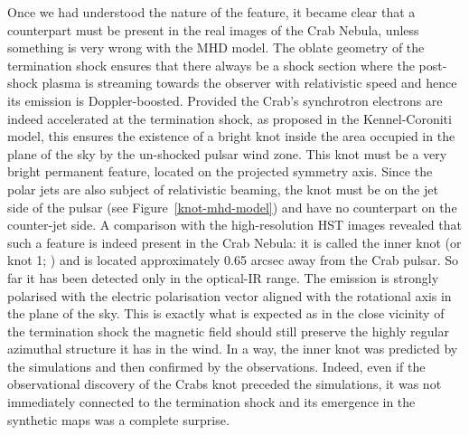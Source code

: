 Once we had understood the nature of the feature, it became clear that a counterpart must be present in the real images of the Crab Nebula, unless something is very wrong with the MHD model. The oblate geometry of the termination shock ensures that there always be a shock section where the post-shock plasma is streaming towards the observer with relativistic speed and hence its emission is Doppler-boosted.   Provided the Crab’s synchrotron electrons are indeed accelerated at the termination shock, as proposed in the Kennel-Coroniti model, this ensures the existence of a bright knot inside the area occupied in the plane of the sky by the un-shocked pulsar wind zone.  This knot must be a very bright permanent feature, located on the projected symmetry axis. Since the polar jets are also subject of relativistic beaming, the knot must be on the jet side of the pulsar (see Figure~\ref{knot-mhd-model}) and have no counterpart on the counter-jet side.      
A comparison with the high-resolution HST images revealed that such a feature is indeed present  in the Crab Nebula: 
it is called the inner knot (or knot 1; \citet{hester-95}) and is located approximately 0.65 arcsec away from the Crab pulsar.  
So far it has been detected only in the optical-IR range.  The emission is strongly polarised with the electric polarisation vector aligned with the rotational axis in the plane of the sky. This is exactly what is expected as in the close vicinity of the termination shock the magnetic field should still preserve the highly regular azimuthal structure it has in the wind.  In a way, the inner knot was predicted by the simulations and then confirmed by the observations. Indeed, even if the observational discovery of the Crabs knot  preceded  the simulations, it was not immediately connected to the termination shock and its emergence in the synthetic maps was a complete surprise.       

